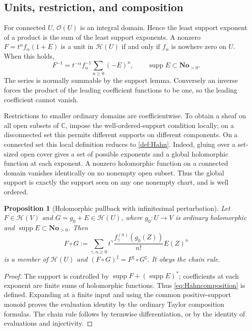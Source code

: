 \documentclass[11pt,letterpaper]{article}
\numberwithin{equation}{section}
\newtheorem{proposition}[proposition]{Proposition}
\theoremstyle{definition}
\theoremstyle{remark}
\newcommand{\No}{\mathbf{No}}
\newcommand{\C}{\mathbb C}
\newcommand{\OO}{\mathcal O}
\newcommand{\HH}{\mathscr H}
\DeclareMathOperator{\supp}{supp}
\begin{document}
\subsection{Units, restriction, and composition}

For connected $U$, $\OO(U)$ is an integral domain. Hence the least support
exponent of a product is the sum of the least support exponents.
A nonzero $F=t^\alpha f_\alpha(1+E)$ is a unit in $\HH(U)$ if and only
if $f_\alpha$ is nowhere zero on $U$. When this holds,
\begin{equation}\label{eq:unitinverse}
 F^{-1}=t^{-\alpha}f_\alpha^{-1}\sum_{n\ge0}(-E)^n,
 \qquad \supp E\subset\No_{>0}.
\end{equation}
The series is normally summable by the support lemma. Conversely an
inverse forces the product of the leading coefficient functions to be
one, so the leading coefficient cannot vanish.

Restrictions to smaller ordinary domains are coefficientwise. To obtain
a sheaf on all open subsets of $\C$, impose the well-ordered-support
condition locally; on a disconnected set this permits different supports
on different components. On a connected set this local definition reduces
to \cref{def:Hahn}. Indeed, gluing over a set-sized open cover gives a
set of possible exponents and a global holomorphic function at each
exponent. A nonzero holomorphic function on a connected domain vanishes
identically on no nonempty open subset. Thus the global support is exactly
the support seen on any one nonempty chart, and is well ordered.

\begin{proposition}[Holomorphic pullback with infinitesimal perturbation]
Let $F\in\HH(V)$ and
$G=g_0+E\in\HH(U)$, where $g_0:U\to V$ is ordinary holomorphic and
$\supp E\subset\No_{>0}$. Then
\begin{equation}\label{eq:Hahncomposition}
 F\circ G:=\sum_{\gamma,n\ge0}
 t^\gamma\frac{f_\gamma^{(n)}(g_0(Z))}{n!}E(Z)^n
\end{equation}
is a member of $\HH(U)$ and
$(F\circ G)^\sharp=F^\sharp\circ G^\sharp$.
It obeys the chain rule.
\end{proposition}
\begin{proof}
The support is controlled by $\supp F+(\supp E)^*$; coefficients at
each exponent are finite sums of holomorphic functions. Thus
\eqref{eq:Hahncomposition} is defined. Expanding at a finite input and
using the common positive-support monoid proves the evaluation identity
by the ordinary Taylor composition formulas. The chain rule follows by
termwise differentiation, or by the identity of evaluations and injectivity.
\end{proof}
\end{document}
